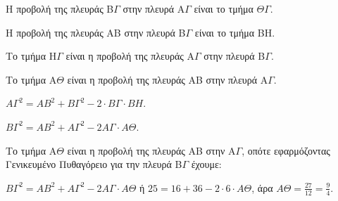 \begin{alist}
    \item[α)]
    \begin{rlist}
        \item Η προβολή της πλευράς Β$\Gamma$ στην πλευρά Α$\Gamma$ είναι το τμήμα $\Theta\Gamma$.
        \item Η προβολή της πλευράς ΑΒ στην πλευρά Β$\Gamma$ είναι το τμήμα ΒΗ.
        \item Το τμήμα Η$\Gamma$ είναι η προβολή της πλευράς Α$\Gamma$ στην πλευρά Β$\Gamma$.
        \item Το τμήμα Α$\Theta$ είναι η προβολή της πλευράς ΑΒ στην πλευρά Α$\Gamma$.
        \item $A\Gamma^2 = AB^2 + B\Gamma^2 - 2 \cdot B\Gamma \cdot BH$.
        \item $B\Gamma^2 = AB^2 + A\Gamma^2 - 2A\Gamma \cdot A\Theta$.
    \end{rlist}
    \item[β)] Το τμήμα Α$\Theta$ είναι η προβολή της πλευράς ΑΒ στην Α$\Gamma$, οπότε εφαρμόζοντας Γενικευμένο Πυθαγόρειο για την πλευρά Β$\Gamma$ έχουμε:
    \begin{rlist}
        \item $B\Gamma^2 = AB^2 + A\Gamma^2 - 2A\Gamma \cdot A\Theta$ ή $25 = 16 + 36 - 2 \cdot 6 \cdot A\Theta$, άρα $A\Theta = \frac{27}{12} = \frac{9}{4}$.
    \end{rlist}
\end{alist}